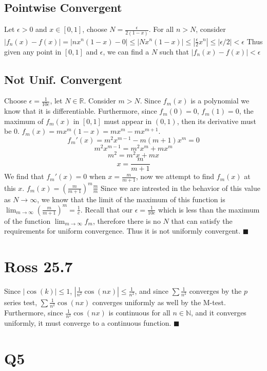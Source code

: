 \documentclass[12pt]{article}
\newcommand{\N}{\mathbb{N}}
\newcommand{\R}{\mathbb{R}}
\begin{document}
\subsection{Pointwise Convergent}
Let $\epsilon > 0$ and $x \in [0,1]$, choose $N = \frac{\epsilon}{2(1-x)}$. For all $n > N$, consider $|f_n(x)-f(x)|= |nx^n(1-x)-0| \leq |Nx^n(1-x)| \leq |\frac{\epsilon}{2}x^n| \leq |\epsilon/2| < \epsilon$
\newline
Thus given any point in $[0,1]$ and $\epsilon$, we can find a $N$ such that $|f_n(x)-f(x)|<\epsilon$

\subsection{Not Unif. Convergent}
Choose $\epsilon = \frac{1}{10e}$, let $N \in \R$. Consider $m > N$. Since $f_m(x)$ is a polynomial we know that it is differentiable. Furthermore, since $f_m(0)=0$, $f_m(1)=0$, the maximum of $f_m(x)$ in $[0,1]$ must appear in $(0,1)$, then its derivative must be 0. $f_m(x)=mx^m(1-x)=mx^m-mx^{m+1}$.
$$f_m'(x)= m^2x^{m-1}-m(m+1)x^{m} = 0$$
$$m^2x^{m-1}=m^2x^m+mx^m$$
$$m^2 = m^2x+mx$$
$$x = \frac{m}{m+1}$$
We find that $f_m'(x)=0$ when $x = \frac{m}{m+1}$, now we attempt to find $f_m(x)$ at this $x$. $f_m(x)=(\frac{m}{m+1})^m \frac{m}{m}$
\newline
Since we are intrested in the behavior of this value as $N \to \infty$, we know that the limit of the maximum of this function is $\lim_{m \to \infty}(\frac{m}{m+1})^m = \frac{1}{e}$. Recall that our $\epsilon = \frac{1}{10e}$ which is less than the maximum of the function $\lim_{m \to \infty} f_m$, therefore there is no $N$ that can satisfy the requirements for uniform convergence.
Thus it is not uniformly convergent.
$\blacksquare$
\newpage


\section{Ross 25.7}
Since $|\cos(k)| \leq 1$, $|\frac{1}{n^2}\cos(nx)| \leq \frac{1}{n^2}$, and since $\sum \frac{1}{n^2}$ converges by the $p$ series test, $\sum \frac{1}{n^2}\cos(nx)$ converges uniformly as well by the M-test.
\newline
Furthermore, since $\frac{1}{n^2}\cos(nx)$ is continuous for all $n \in \N$, and it converges uniformly, it must converge to a continuous function.
\newline
$\blacksquare$
\newpage


\section{Q5}
\end{document}
